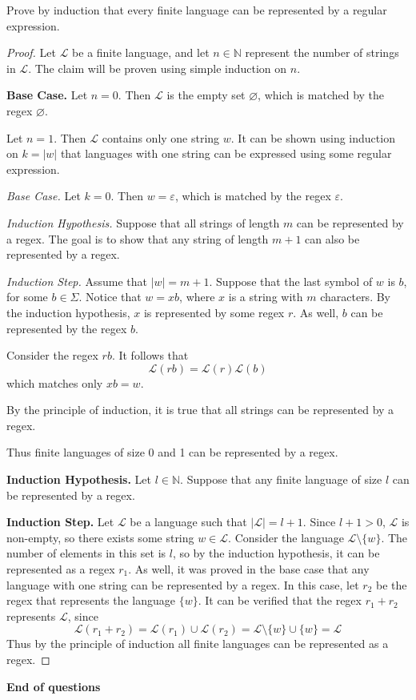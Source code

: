 \documentclass[11pt]{article}
\begin{document}
\begin{enumerate}[label=\textbf{Q\arabic*.}]
Prove by induction that every finite language can be represented by a regular expression.
\begin{proof}
	Let \(\mathcal{L}\) be a finite language, and let \(n \in \mathbb{N}\) represent the number of strings in \(\mathcal{L}\). The claim will be proven using simple induction on \(n\).

	\textbf{Base Case.} Let \(n = 0\). Then \(\mathcal{L}\) is the empty set \(\varnothing\), which is matched by the regex \(\varnothing\).

	Let \(n=1\). Then \(\mathcal{L}\) contains only one string \(w\). It can be shown using induction on \(k=|w|\) that languages with one string can be expressed using some regular expression.

	\textit{Base Case.} Let \(k=0\). Then \(w = \varepsilon\), which is matched by the regex \(\varepsilon\).

	\textit{Induction Hypothesis.} Suppose that all strings of length \(m\) can be represented by a regex. The goal is to show that any string of length \(m+1\) can also be represented by a regex.

	\textit{Induction Step.} Assume that \(|w| = m+1\). Suppose that the last symbol of \(w\) is \(b\), for some \(b \in \Sigma\). Notice that \(w = xb\), where \(x\) is a string with \(m\) characters. By the induction hypothesis, \(x\) is represented by some regex \(r\). As well, \(b\) can be represented by the regex \(b\).

	Consider the regex \(rb\). It follows that
	\[
		\mathcal{L} (rb) = \mathcal{L} (r) \mathcal{L} (b)
	\]
	which matches only \(xb = w\).

	By the principle of induction, it is true that all strings can be represented by a regex.

	Thus finite languages of size 0 and 1 can be represented by a regex.

	\textbf{Induction Hypothesis.} Let \(l \in \mathbb{N}\). Suppose that any finite language of size \(l\) can be represented by a regex.

	\textbf{Induction Step.} Let \(\mathcal{L}\) be a language such that \(|\mathcal{L}| = l + 1\). Since \(l+1 > 0\), \(\mathcal{L}\) is non-empty, so there exists some string \(w \in \mathcal{L}\). Consider the language \(\mathcal{L} \setminus \{w\}\). The number of elements in this set is \(l\), so by the induction hypothesis, it can be represented as a regex \(r_1\). As well, it was proved in the base case that any language with one string can be represented by a regex. In this case, let \(r_2\) be the regex that represents the language \(\{w\}\). It can be verified that the regex \(r_1 + r_2\) represents \(\mathcal{L}\), since
	\[
		\mathcal{L} (r_1 + r_2) = \mathcal{L} (r_1) \cup \mathcal{L} (r_2) = \mathcal{L} \setminus \{w\} \cup \{w\} = \mathcal{L}
	\]
	Thus by the principle of induction all finite languages can be represented as a regex.

\end{proof}


	\end{enumerate}

\vspace{1cm}

 \textbf{End of questions}
\end{document}
